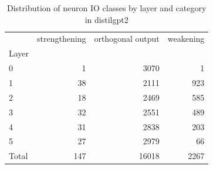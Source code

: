 \begin{table}
\caption{Distribution of neuron IO classes by layer and category in distilgpt2}
\label{tab:distilgpt2}
\begin{tabular}{lrrr}
 & strengthening & orthogonal output & weakening \\
Layer &  &  &  \\
0 & 1 & 3070 & 1 \\
1 & 38 & 2111 & 923 \\
2 & 18 & 2469 & 585 \\
3 & 32 & 2551 & 489 \\
4 & 31 & 2838 & 203 \\
5 & 27 & 2979 & 66 \\
Total & 147 & 16018 & 2267 \\
\end{tabular}
\end{table}
